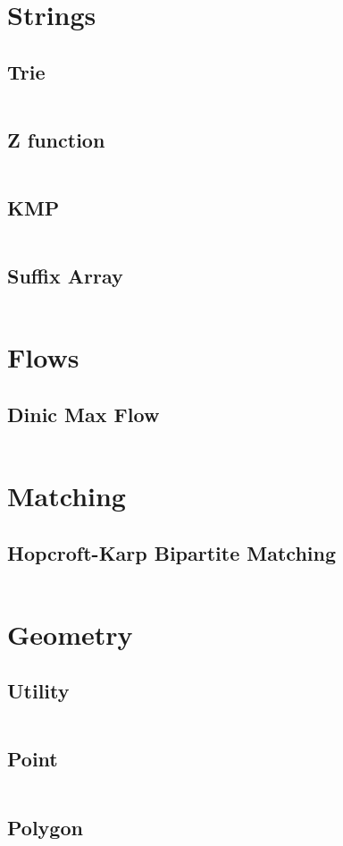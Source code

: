 \section{Strings}
  \subsection{Trie}
    \inputminted{cpp}{library/strings/trie.hpp}
  \subsection{Z function}
    \inputminted{cpp}{library/strings/z_function.hpp}
  \subsection{KMP}
    \inputminted{cpp}{library/strings/kmp.hpp}
  \subsection{Suffix Array}
    \inputminted{cpp}{library/strings/suffix_array.hpp}

\section{Flows}
  \subsection{Dinic Max Flow}
    \inputminted{cpp}{library/flows/dinic.hpp}

\section{Matching}
  \subsection{Hopcroft-Karp Bipartite Matching}
    \inputminted{cpp}{library/matching/hopcroft_karp.hpp}

\section{Geometry}
  \subsection{Utility}
    \inputminted{cpp}{library/geo/geoutil.hpp}
  \subsection{Point}
    \inputminted{cpp}{library/geo/point.hpp}
  \subsection{Polygon}
    \inputminted{cpp}{library/geo/polygon.hpp}